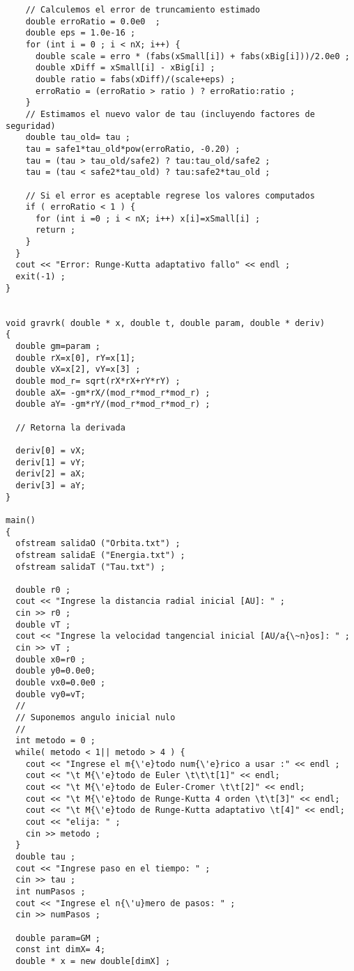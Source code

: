 \begin{verbatim}
    // Calculemos el error de truncamiento estimado
    double erroRatio = 0.0e0  ;
    double eps = 1.0e-16 ;
    for (int i = 0 ; i < nX; i++) {
      double scale = erro * (fabs(xSmall[i]) + fabs(xBig[i]))/2.0e0 ;
      double xDiff = xSmall[i] - xBig[i] ;
      double ratio = fabs(xDiff)/(scale+eps) ;
      erroRatio = (erroRatio > ratio ) ? erroRatio:ratio ;
    }
    // Estimamos el nuevo valor de tau (incluyendo factores de seguridad)
    double tau_old= tau ;
    tau = safe1*tau_old*pow(erroRatio, -0.20) ;
    tau = (tau > tau_old/safe2) ? tau:tau_old/safe2 ;
    tau = (tau < safe2*tau_old) ? tau:safe2*tau_old ;

    // Si el error es aceptable regrese los valores computados
    if ( erroRatio < 1 ) {
      for (int i =0 ; i < nX; i++) x[i]=xSmall[i] ;
      return ;
    }
  }
  cout << "Error: Runge-Kutta adaptativo fallo" << endl ;
  exit(-1) ;
}


void gravrk( double * x, double t, double param, double * deriv)
{
  double gm=param ;
  double rX=x[0], rY=x[1];
  double vX=x[2], vY=x[3] ;
  double mod_r= sqrt(rX*rX+rY*rY) ;
  double aX= -gm*rX/(mod_r*mod_r*mod_r) ;
  double aY= -gm*rY/(mod_r*mod_r*mod_r) ;
  
  // Retorna la derivada

  deriv[0] = vX;
  deriv[1] = vY;
  deriv[2] = aX;
  deriv[3] = aY;
}

main()
{
  ofstream salidaO ("Orbita.txt") ;
  ofstream salidaE ("Energia.txt") ;
  ofstream salidaT ("Tau.txt") ;

  double r0 ;
  cout << "Ingrese la distancia radial inicial [AU]: " ;
  cin >> r0 ;
  double vT ;
  cout << "Ingrese la velocidad tangencial inicial [AU/a{\~n}os]: " ;
  cin >> vT ;
  double x0=r0 ;
  double y0=0.0e0;
  double vx0=0.0e0 ;
  double vy0=vT;
  //
  // Suponemos angulo inicial nulo 
  //
  int metodo = 0 ;
  while( metodo < 1|| metodo > 4 ) {
    cout << "Ingrese el m{\'e}todo num{\'e}rico a usar :" << endl ;
    cout << "\t M{\'e}todo de Euler \t\t\t[1]" << endl;
    cout << "\t M{\'e}todo de Euler-Cromer \t\t[2]" << endl;
    cout << "\t M{\'e}todo de Runge-Kutta 4 orden \t\t[3]" << endl;
    cout << "\t M{\'e}todo de Runge-Kutta adaptativo \t[4]" << endl;
    cout << "elija: " ;
    cin >> metodo ;
  }
  double tau ;
  cout << "Ingrese paso en el tiempo: " ;
  cin >> tau ;
  int numPasos ;
  cout << "Ingrese el n{\'u}mero de pasos: " ;
  cin >> numPasos ;

  double param=GM ;
  const int dimX= 4;
  double * x = new double[dimX] ;


\end{verbatim}
